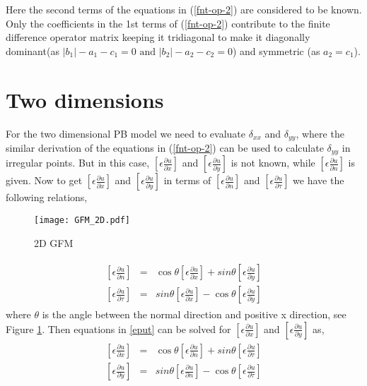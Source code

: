 Here the second terms of the equations in (\ref{fnt-op-2}) are considered to be known. Only the coefficients in the 1st terms of (\ref{fnt-op-2}) contribute to the finite difference operator matrix keeping it tridiagonal to make it diagonally dominant(as $|b_1|-a_1-c_1=0\text{ and } |b_2|-a_2-c_2=0$) and symmetric (as $a_2=c_1$).  

  
\section{Two dimensions}
For the two dimensional PB model we need to evaluate $\delta_{xx}$ and $\delta_{yy}$, where the similar derivation of the equations in (\ref{fnt-op-2}) can be used to calculate $\delta_{yy}$ in irregular points. But in this case,  $\left[ \epsilon \frac{\partial u}{\partial x} \right]$ and $\left[ \epsilon \frac{\partial u}{\partial y} \right]$ is not known, while $\left[ \epsilon \frac{\partial u}{\partial n} \right]$ is given. Now to get $\left[ \epsilon \frac{\partial u}{\partial x} \right]$ and $\left[ \epsilon \frac{\partial u}{\partial y} \right]$ in terms of $\left[ \epsilon \frac{\partial u}{\partial n} \right]$ and $\left[ \epsilon \frac{\partial u}{\partial \tau} \right]$ we have the following relations,  
\begin{figure}[ht]
\begin{center}
\texttt{[image: GFM\_2D.pdf]}
\caption{2D GFM}
\label{fig_gfm_2D}
\end{center}
\end{figure}

\begin{eqnarray}
\begin{aligned}
			\left[\epsilon \frac{\partial u}{\partial n}\right] &=& \cos \theta \left[\epsilon \frac{\partial u}{\partial x}\right] + sin \theta \left[\epsilon \frac{\partial u}{\partial y}\right]\label{epun} \\
			\left[\epsilon \frac{\partial u}{\partial \tau}\right] &=& sin \theta \left[\epsilon \frac{\partial u}{\partial x}\right] - \cos \theta\left[\epsilon \frac{\partial u}{\partial y}\right]\label{eput}	
\end{aligned}		
\end{eqnarray}
where $\theta$ is the angle between the normal direction and positive x direction, see Figure \ref{fig_gfm_2D}. 
Then equations in \ref{eput} can be solved for $ \left[\epsilon \frac{\partial u}{\partial x}\right]$ and $\left[\epsilon \frac{\partial u}{\partial y}\right]$ as,
\begin{eqnarray}
\begin{aligned}
	\left[\epsilon \frac{\partial u}{\partial x}\right] &=& \cos \theta \left[\epsilon \frac{\partial u}{\partial n}\right] +sin \theta \left[\epsilon \frac{\partial u}{\partial \tau}\right]\label{epux1} \\
	\left[\epsilon \frac{\partial u}{\partial y}\right] &=& sin \theta \left[\epsilon \frac{\partial u}{\partial n}\right] -\cos \theta \left[\epsilon \frac{\partial u}{\partial \tau}\right]\label{epuy1}
\end{aligned}	
\end{eqnarray}

